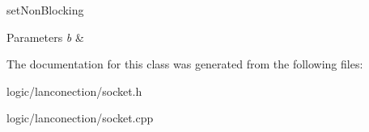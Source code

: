 set\-Non\-Blocking 


\begin{DoxyParams}{Parameters}
{\em b} & \\
\hline
\end{DoxyParams}


The documentation for this class was generated from the following files\-:\begin{DoxyCompactItemize}
\item 
logic/lanconection/socket.\-h\item 
logic/lanconection/socket.\-cpp\end{DoxyCompactItemize}
